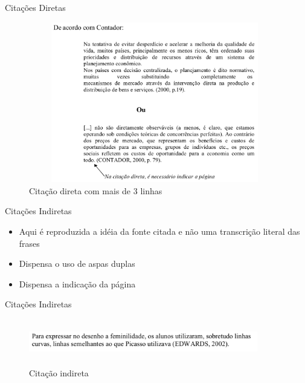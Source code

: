 \begin{frame}	
	\begin{block}{Citações Diretas}	
		 \begin{figure}[!htb]
			\centering	  				
			\includegraphics[height=7cm, width = 11cm]{./pic/diretamais3linhas.png}
			\caption{Citação direta com mais de 3 linhas}
			\author{Guia de formatação SENAC }
			\label{fig_citacaodiretamais3linhas}
		\end{figure}
	\end{block}
\end{frame}

\begin{frame}	
	\begin{block}{Citações Indiretas}	
		\begin{itemize}
			\item Aqui é reproduzida a idéia da fonte citada e não uma transcrição literal das frases
			\item Dispensa o uso de aspas duplas
			\item Dispensa a indicação da página
		\end{itemize}
	\end{block}
\end{frame}

\begin{frame}	
	\begin{block}{Citações Indiretas}	
		 \begin{figure}[!htb]
			\centering	  				
			\includegraphics[height=2cm, width = 10cm]{./pic/citacaoindireta.png}
			\caption{Citação indireta}
			\author{Guia de formatação SENAC }
			\label{fig_citacaoindireta}
		\end{figure}
	\end{block}
\end{frame}

